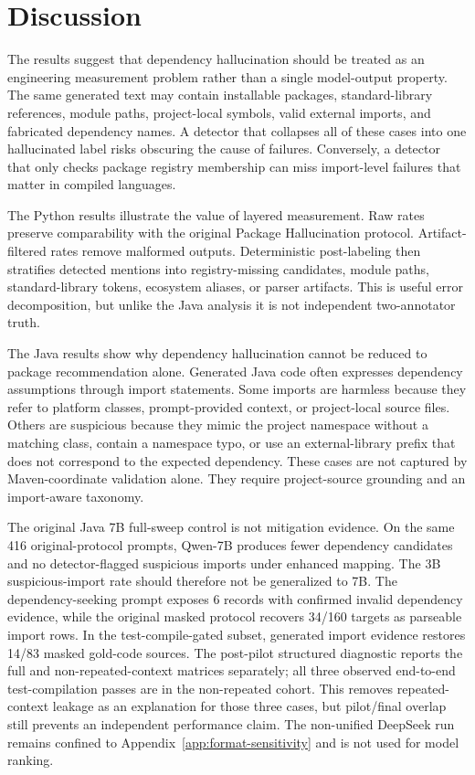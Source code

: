\documentclass[pdflatex,sn-basic]{sn-jnl}
\begin{document}
\section{Discussion}

The results suggest that dependency hallucination should be treated as an engineering measurement problem rather than a single model-output property. The same generated text may contain installable packages, standard-library references, module paths, project-local symbols, valid external imports, and fabricated dependency names. A detector that collapses all of these cases into one hallucinated label risks obscuring the cause of failures. Conversely, a detector that only checks package registry membership can miss import-level failures that matter in compiled languages.

The Python results illustrate the value of layered measurement. Raw rates preserve comparability with the original Package Hallucination protocol. Artifact-filtered rates remove malformed outputs. Deterministic post-labeling then stratifies detected mentions into registry-missing candidates, module paths, standard-library tokens, ecosystem aliases, or parser artifacts. This is useful error decomposition, but unlike the Java analysis it is not independent two-annotator truth.

The Java results show why dependency hallucination cannot be reduced to package recommendation alone. Generated Java code often expresses dependency assumptions through import statements. Some imports are harmless because they refer to platform classes, prompt-provided context, or project-local source files. Others are suspicious because they mimic the project namespace without a matching class, contain a namespace typo, or use an external-library prefix that does not correspond to the expected dependency. These cases are not captured by Maven-coordinate validation alone. They require project-source grounding and an import-aware taxonomy.

The original Java 7B full-sweep control is not mitigation evidence. On the same 416 original-protocol prompts, Qwen-7B produces fewer dependency candidates and no detector-flagged suspicious imports under enhanced mapping. The 3B suspicious-import rate should therefore not be generalized to 7B. The dependency-seeking prompt exposes 6 records with confirmed invalid dependency evidence, while the original masked protocol recovers 34/160 targets as parseable import rows. In the test-compile-gated subset, generated import evidence restores 14/83 masked gold-code sources. The post-pilot structured diagnostic reports the full and non-repeated-context matrices separately; all three observed end-to-end test-compilation passes are in the non-repeated cohort. This removes repeated-context leakage as an explanation for those three cases, but pilot/final overlap still prevents an independent performance claim. The non-unified DeepSeek run remains confined to Appendix~\ref{app:format-sensitivity} and is not used for model ranking.
\end{document}
